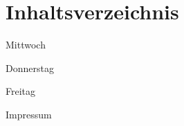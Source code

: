\section*{Inhaltsverzeichnis}


\vspace*{0.35em}%
\noindent Mittwoch \dotfill \pageref{mittwoch}

\vspace*{0.35em}%
\noindent Donnerstag \dotfill \pageref{donnerstag}

\vspace*{0.35em}%
\noindent Freitag \dotfill \pageref{freitag}

\vspace*{0.35em}%
\noindent Impressum \dotfill \pageref{impressum}\\

\newpage

\newpage